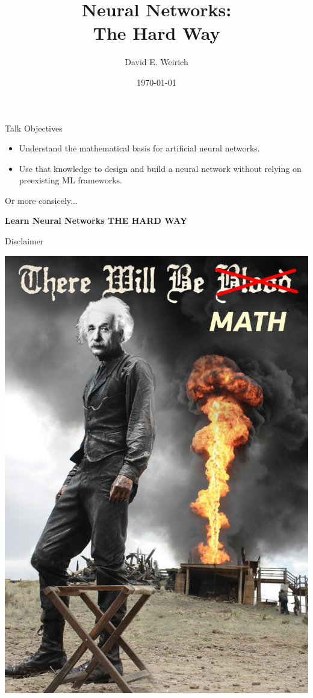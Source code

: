 \documentclass[11pt]{beamer}
\author{David E. Weirich}
\title{Neural Networks: \\ The Hard Way}
\date{\today}
\begin{document}
\begin{frame}
\titlepage
\end{frame}

\begin{frame}{Talk Objectives}

\begin{itemize}
\item Understand the mathematical basis for artificial neural networks.

\item Use that knowledge to design and build a neural network without relying on preexisting ML frameworks.
\end{itemize}

Or more consicely...

\textbf{Learn Neural Networks THE HARD WAY}

\end{frame}

\begin{frame}{Disclaimer}
\begin{center}
\includegraphics[scale=0.18]{ThereWillBeMath}
\end{center}
\end{frame}
\end{document}
